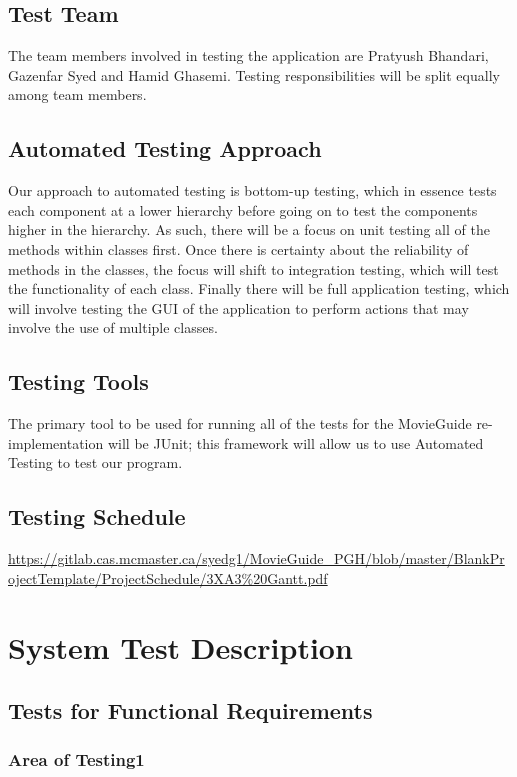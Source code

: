 \documentclass[12pt, titlepage]{article}
\begin{document}
\subsection{Test Team}
The team members involved in testing the application are Pratyush Bhandari, Gazenfar Syed and Hamid Ghasemi. Testing responsibilities will be split equally among team members.

\subsection{Automated Testing Approach}
Our approach to automated testing is bottom-up testing, which in essence tests each component at a lower hierarchy before going on to test the components higher in the hierarchy. As such, there will be a focus on unit testing all of the methods within classes first. Once there is certainty about the reliability of methods in the classes, the focus will shift to integration testing, which will test the functionality of each class. Finally there will be full application testing, which will involve testing the GUI of the application to perform actions that may involve  the use of multiple classes.

\subsection{Testing Tools}
The primary tool to be used for running all of the tests for the MovieGuide re-implementation will be JUnit; this framework will allow us to use Automated Testing to test our program.

\subsection{Testing Schedule}
		
\url{https://gitlab.cas.mcmaster.ca/syedg1/MovieGuide_PGH/blob/master/BlankProjectTemplate/ProjectSchedule/3XA3%20Gantt.pdf}

\section{System Test Description}
	
\subsection{Tests for Functional Requirements}

\subsubsection{Area of Testing1}
		
\end{document}
